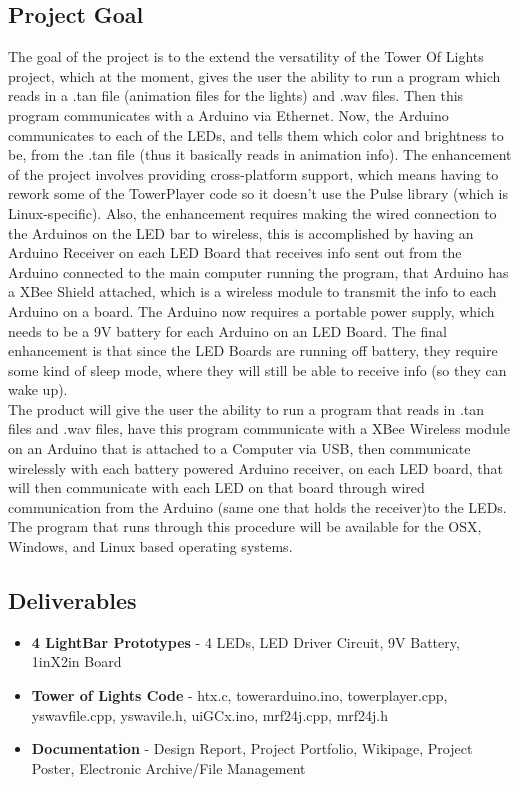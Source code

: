 \documentclass[12pt]{article}
\begin{document}
			\subsection{Project Goal}
			The goal of the project is to the extend the versatility of the Tower Of Lights project, which at the moment, gives the user the ability to run a program which reads in a .tan file (animation files for the lights) and .wav files. Then this
			program communicates with a Arduino via Ethernet. Now, the Arduino communicates to each of the LEDs, and tells them which
			color and brightness to be, from the .tan file (thus it basically reads in animation info). 
			The enhancement of the project involves providing cross-platform support, which means having to rework some of the TowerPlayer code so it doesn't use the Pulse library (which is Linux-specific). Also, the enhancement requires making the wired connection to the Arduinos on the LED bar to wireless, this is accomplished by having an Arduino Receiver on each LED Board that receives info sent out from the Arduino connected to the main computer running the program, that Arduino has a XBee Shield attached, which is a wireless module to transmit the info to each Arduino on a board. The Arduino now requires a portable power supply, which needs to be a 9V battery for each Arduino on an LED Board. The final enhancement is that since the LED Boards are running off battery, they require some kind of sleep mode, where they will still be able to receive info (so they can wake up).\\
			The product will give the user the ability to run a program that reads in .tan files and .wav files, have this program communicate with a XBee Wireless module on an Arduino that is attached to a Computer via USB, then communicate wirelessly with each battery powered Arduino receiver, on each LED board, that will then communicate with each LED on that board through wired communication from the Arduino (same one that holds the receiver)to the LEDs. The program that runs through this procedure will be available for the OSX, Windows, and Linux based operating systems.
			
			\subsection{Deliverables}
				\begin{itemize}
					\item \textbf{4 LightBar Prototypes} - 4 LEDs, LED Driver Circuit, 9V Battery, 1inX2in Board\\
					\item \textbf{Tower of Lights Code} - htx.c, towerarduino.ino, towerplayer.cpp, yswavfile.cpp, yswavile.h, uiGCx.ino, mrf24j.cpp, mrf24j.h\\
					\item \textbf{Documentation} - Design Report, Project Portfolio, Wikipage, Project Poster, Electronic Archive/File Management 	
				\end{itemize}
			
\end{document}

